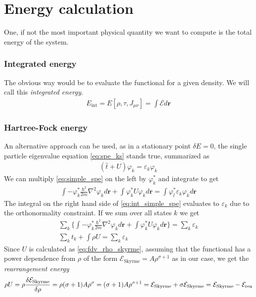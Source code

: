 \section{Energy calculation}
One, if not the most important physical quantity we want to compute is the total energy of the system.
\subsubsection{Integrated energy}
The obvious way would be to evaluate the functional for a given density. We will call this \textit{integrated energy}.
\begin{align*}
    E_\text{int} = E[\rho, \tau, J_{\mu\nu}]= \int \mathcal E d\mathbf r
\end{align*}
\subsubsection{Hartree-Fock energy}
An alternative approach can be used, as in a stationary point $\delta E = 0$, the single particle eigenvalue equation \eqref{eq:spe_ks} stands true, summarized as 
\begin{align}
    \label{eq:simple_spe}
    (\hat t + U)\varphi_k = \varepsilon_k \varphi_k
\end{align}
We can multiply \eqref{eq:simple_spe} on the left by $\varphi_k^*$ and integrate to get
\begin{align}
    \label{eq:int_simple_spe}
    \int -\varphi_k^* \frac{\hbar^2}{2m}\nabla^2\varphi_k d\bm r + \int \varphi_k^* U \varphi_k d\bm r = \int \varphi_l^* \varepsilon_k \varphi_k d\bm r
\end{align}
The integral on the right hand side of \eqref{eq:int_simple_spe} evaluates to $\varepsilon_k$ due to the orthonormality constraint. If we sum over all states $k$ we get
\begin{align}
    \sum_k \bigg\{\int -\varphi_k^* \frac{\hbar^2}{2m}\nabla^2\varphi_k d\bm r + \int \varphi_k^* U \varphi_k d\bm r \bigg\}= \sum_k \varepsilon_k 
    \\\sum_k t_k + \int \rho U = \sum_k \varepsilon_k \label{eq:sum_spe}
\end{align}
Since $U$ is calculated as \eqref{eq:fdv_rho_skyrme}, assuming that the functional has a power dependence from $\rho$ of the form $\mathcal E_\text{Skyrme} = A\rho^{\sigma+1}$ as in our case, we get the \textit{rearrangement energy}
\begin{align}
    \label{eq:sum_spe_new}
    \rho U = \rho \fdv{\mathcal E_\text{Skyrme}}{\rho} = \rho(\sigma +1)A \rho^\sigma = (\sigma+1)A \rho^{\sigma+1} = \mathcal E_\text{Skyrme} + \sigma \mathcal E_\text{Skyrme} = \mathcal E_\text{Skyrme} - \mathcal E_\text{rea}
\end{align}
